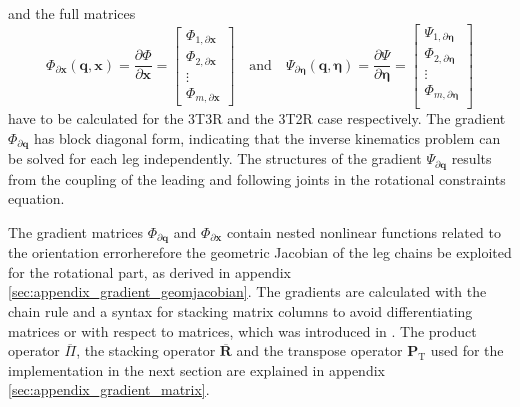 \documentclass[robotics,article,accept,moreauthors,pdftex]{Definitions/mdpi}
\newcommand{\bm}[1]{\boldsymbol{#1}}
\newcommand{\transp}[0]{{\mathrm{T}}}
\let\Phi\varPhi
\let\Psi\varPsi
\begin{document}
%
and the full  matrices 
%
\begin{equation}
\bm{\Phi}_{\partial \bm{x}}(\bm{q},\bm{x})
=
\frac{\partial \bm{\Phi}}{\partial \bm{x}}
=
\begin{bmatrix}
\bm{\Phi}_{1,\partial\bm{x}} \\
\bm{\Phi}_{2,\partial\bm{x}} \\
\vdots \\
\bm{\Phi}_{m,\partial\bm{x}}
\end{bmatrix}
\quad
\mathrm{and}
\quad
\bm{\Psi}_{\partial \bm{\eta}}(\bm{q},\bm{\eta})
=
\frac{\partial \bm{\Psi}}{\partial \bm{\eta}}
=
\begin{bmatrix}
\bm{\Psi}_{1,\partial\bm{\eta}} \\
\bm{\Phi}_{2,\partial\bm{\eta}} \\
\vdots \\
\bm{\Phi}_{m,\partial\bm{\eta}} \\
\end{bmatrix}
\label{equ:PhiPsi_grad_x_complete}
\end{equation}
%
have to be calculated for the 3T3R and the 3T2R case respectively.
The gradient $\bm{\Phi}_{\partial \bm{q}}$ has block diagonal form, indicating that the inverse kinematics problem can be solved for each leg independently.
The structures of the gradient $\bm{\Psi}_{\partial \bm{q}}$ results from the coupling of the leading and following joints in the rotational constraints equation.

The gradient matrices $\bm{\Phi}_{\partial \bm{q}}$ and $\bm{\Phi}_{\partial \bm{x}}$ contain nested nonlinear functions related to the orientation errorherefore\added[id=Sp]{,} the geometric Jacobian of the leg chains  be exploited for the rotational part, as derived in appendix\,\ref{sec:appendix_gradient_geomjacobian}.
The gradients are calculated with the chain rule and a syntax for stacking matrix columns to avoid differentiating matrices or with respect to matrices, which was introduced in \cite{1_SchapplerTapOrt2019}.
The product operator $\overline{\Pi}$, the stacking operator $\overline{\bm{R}}$ and the transpose operator $\bm{P}_\transp$ used for the implementation in the next section are explained in appendix\,\ref{sec:appendix_gradient_matrix}.
\end{document}
